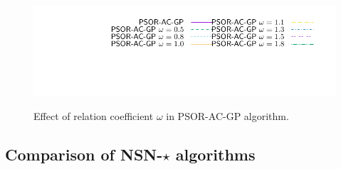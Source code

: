 \documentclass[a4paper]{article}
\begin{document}
\begin{figure}
{\includegraphics[height=\legendheight]{../figure/PSOR/1.0e-08/50/time/profile-Chain_legend.pdf}} 
  \caption{Effect of relation coefficient $\omega$ in {\sf PSOR-AC-GP} algorithm.}
  \label{fig:PSOR}
\end{figure}

\subsection{Comparison of {\sf NSN-$\star$} algorithms}
\end{document}
